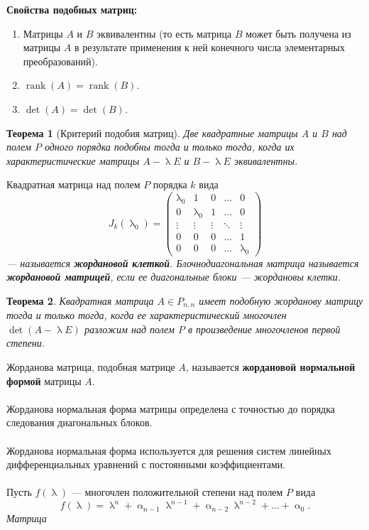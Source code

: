 \documentclass[a4paper, 12pt]{report}
\numberwithin{equation}{section}
\renewcommand{\alpha}{\upalpha}
\renewcommand{\lambda}{\uplambda}
\newcommand{\rank}{\operatorname{rank}}
\newtheorem*{theorem}{Теорема}
\begin{document}
	{\textbf{Свойства подобных матриц:}}
	\begin{enumerate}
		\item {Матрицы $A$ и $B$ эквивалентны (то есть матрица $B$ может быть получена из матрицы $A$ в результате применения к ней конечного числа элементарных преобразований).}
		\item $\rank(A) = \rank(B)$.
		\item $\det (A) = \det(B)$.
	\end{enumerate}
	\begin{theorem}
		[Критерий подобия матриц]
		Две квадратные матрицы $A$ и $B$ над полем $P$ одного порядка подобны тогда и только тогда, когда их характеристические матрицы $A - \lambda E$ и $B - \lambda E$ эквивалентны.
	\end{theorem}
	{Квадратная матрица над полем $P$ порядка $k$ вида}
	$$J_k(\lambda_0) = \begin{pmatrix}
		\lambda_0 & 1 & 0 & \dots & 0 \\
		0 & \lambda_0 & 1 & \dots & 0 \\
		\vdots & \vdots & \vdots & \ddots & \vdots\\
		0 & 0 & 0 & \dots & 1 \\
		0 & 0 & 0 & \dots & \lambda_0 \end{pmatrix} 
	$$ \textit{--- называется \textbf{жордановой клеткой}. Блочнодиагональная матрица называется \textbf{жордановой матрицей}, если ее диагональные блоки --- жордановы клетки.}
	\begin{theorem}
		Квадратная матрица $A\in P_{n,n}$ имеет подобную жорданову матрицу тогда и только тогда, когда ее характеристический многочлен $\det(A - \lambda E)$ разложим над полем $P$ в произведение многочленов первой степени.
	\end{theorem}
	\noindent
	{Жорданова матрица, подобная матрице $A$, называется \textbf{жордановой нормальной формой} матрицы $A$}.
	\\\\
	Жорданова нормальная форма матрицы определена с точностью до порядка следования диагональных блоков.
	\\\\
	Жорданова нормальная форма используется для решения систем линейных дифференциальных уравнений с постоянными коэффициентами.
	\\\\
	{Пусть $f(\lambda)$ --- многочлен положительной степени над полем $P$ вида} $$f(\lambda) = \lambda^n + \alpha_{n-1}\lambda^{n-1} + \alpha_{n-2}\lambda^{n-2} + \ldots + \alpha_0.$$ \textit{Матрица}
\end{document}
